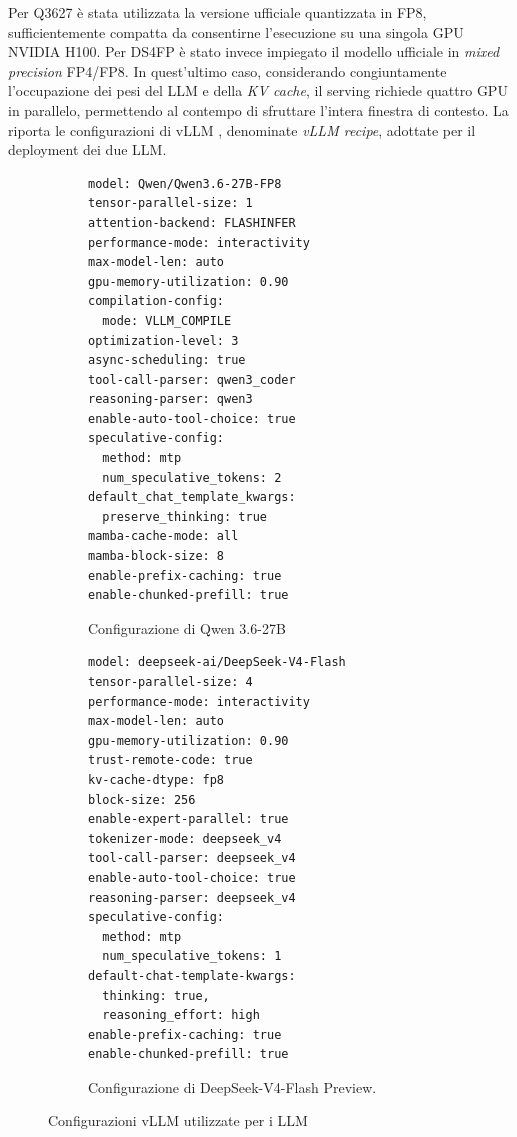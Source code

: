 Per Q3627 è stata utilizzata la versione ufficiale quantizzata in FP8, sufficientemente compatta da consentirne l'esecuzione su una singola GPU NVIDIA H100. Per DS4FP è stato invece impiegato il modello ufficiale in \emph{mixed precision} FP4/FP8. In quest'ultimo caso, considerando congiuntamente l'occupazione dei pesi del LLM e della \emph{KV cache}, il serving richiede quattro GPU in parallelo, permettendo al contempo di sfruttare l'intera finestra di contesto. La  riporta le configurazioni di vLLM \cite{vllm2026vllm}, denominate \emph{vLLM recipe}, adottate per il deployment dei due LLM.

\renewcommand{\topfraction}{0.80}  %
\renewcommand{\textfraction}{0.20} %

\begin{figure}[t]
    \centering
    \begin{subfigure}{0.45\textwidth}
        \centering
        \begin{lstlisting}[frame=single, style=yamlstyle]
model: Qwen/Qwen3.6-27B-FP8
tensor-parallel-size: 1
attention-backend: FLASHINFER
performance-mode: interactivity
max-model-len: auto
gpu-memory-utilization: 0.90
compilation-config:
  mode: VLLM_COMPILE
optimization-level: 3
async-scheduling: true
tool-call-parser: qwen3_coder
reasoning-parser: qwen3
enable-auto-tool-choice: true
speculative-config:
  method: mtp
  num_speculative_tokens: 2
default_chat_template_kwargs:
  preserve_thinking: true
mamba-cache-mode: all
mamba-block-size: 8
enable-prefix-caching: true
enable-chunked-prefill: true 
\end{lstlisting}
        \caption{Configurazione di Qwen 3.6-27B}
        \label{fig:vllm_recipe_q3627}
    \end{subfigure}
    \hspace{0.05\textwidth}
    \begin{subfigure}{0.45\textwidth}
        \centering
        \begin{lstlisting}[frame=single, style=yamlstyle]
model: deepseek-ai/DeepSeek-V4-Flash
tensor-parallel-size: 4
performance-mode: interactivity
max-model-len: auto
gpu-memory-utilization: 0.90
trust-remote-code: true
kv-cache-dtype: fp8
block-size: 256
enable-expert-parallel: true
tokenizer-mode: deepseek_v4
tool-call-parser: deepseek_v4
enable-auto-tool-choice: true
reasoning-parser: deepseek_v4
speculative-config:
  method: mtp
  num_speculative_tokens: 1
default-chat-template-kwargs:
  thinking: true,
  reasoning_effort: high
enable-prefix-caching: true
enable-chunked-prefill: true
        \end{lstlisting}
        \caption{Configurazione di DeepSeek-V4-Flash Preview.}
        \label{fig:vllm_recipe_ds4fp}
    \end{subfigure}
    \caption[Configurazioni vLLM utilizzate]{Configurazioni vLLM utilizzate per i LLM}
    \label{fig:vllm_recipes}
\end{figure}

